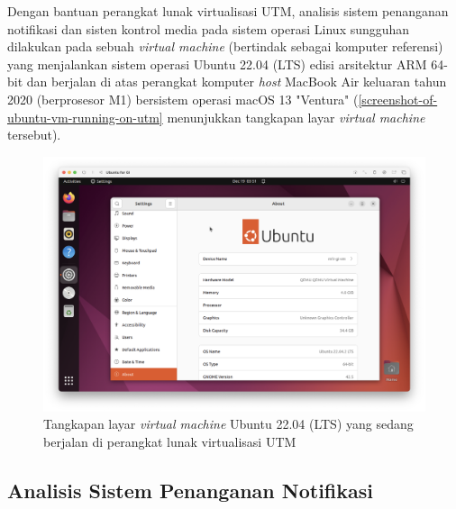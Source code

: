 Dengan bantuan perangkat lunak virtualisasi UTM, analisis sistem penanganan notifikasi dan sisten kontrol media pada sistem operasi Linux sungguhan dilakukan pada sebuah \textit{virtual machine} (bertindak sebagai komputer referensi) yang menjalankan sistem operasi Ubuntu 22.04 (LTS) edisi arsitektur ARM 64-bit dan berjalan di atas perangkat komputer \textit{host} MacBook Air keluaran tahun 2020 (berprosesor M1) bersistem operasi macOS 13 "Ventura" (\autoref{screenshot-of-ubuntu-vm-running-on-utm} menunjukkan tangkapan layar \textit{virtual machine} tersebut).

\begin{figure}[h]
    \centering
    \includegraphics[width=1\linewidth]{assets/Screenshot 2023-12-19 at 10.51.04.png}
    \caption{Tangkapan layar \textit{virtual machine} Ubuntu 22.04 (LTS) yang sedang berjalan di perangkat lunak virtualisasi UTM}
    \label{screenshot-of-ubuntu-vm-running-on-utm}
\end{figure}

\subsection{Analisis Sistem Penanganan Notifikasi}

